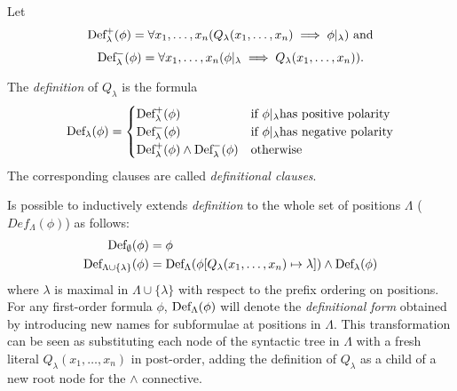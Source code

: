Let 
  \[\fldef{\lambda}[+]{\phi} = \forall x_1, \ldots, x_n(Q_\lambda(x_1,\ldots,x_n)\implies \phi|_\lambda) \text{ and}\]
  \[\fldef{\lambda}[-]{\phi} = \forall x_1, \ldots, x_n(\phi|_\lambda \implies Q_\lambda(x_1,\ldots,x_n)).\]

The \emph{definition} of \(Q_\lambda\) is the formula
\begin{equation}
  \fldef{\lambda}{\phi} = \begin{cases}
                        \fldef{\lambda}[+]{\phi} & \text{if } \phi|_\lambda \text{has positive polarity}\\
                        \fldef{\lambda}[-]{\phi} & \text{if } \phi|_\lambda \text{has negative polarity}\\
                        \fldef{\lambda}[+]{\phi} \land \fldef{\lambda}[-]{\phi} & \text{otherwise}
                      \end{cases}
\end{equation}
The corresponding clauses are called \emph{definitional clauses}.

Is possible to inductively extends \emph{definition} to the whole set of positions \(\Lambda\) (\(Def_\Lambda(\phi)\)) as follows:
\begin{equation}
  \begin{aligned}
    \fldef{\emptyset}{\phi} &= \phi\\
    \fldef{\Lambda\cup\{\lambda\}}{\phi} &= \fldef{\Lambda}{\phi[Q_\lambda(x_1,\ldots,x_n)\mapsto\lambda]} \land \fldef{\lambda}{\phi}
  \end{aligned}
\end{equation}
\indent where \(\lambda\) is maximal in \(\Lambda\cup\{\lambda\}\) with respect to the prefix ordering on positions.
For any first-order formula \(\phi\), \(\fldef{\Lambda}{\phi}\) will denote the \emph{definitional form} obtained by introducing new names for subformulae at positions in \(\Lambda\).
This transformation can be seen as substituting each node of the syntactic tree in \(\Lambda\) with a fresh literal \(Q_\lambda(x_1,\ldots,x_n)\) in post-order, adding the definition of \(Q_\lambda\) as a child of a new root node for the \(\land\) connective.

